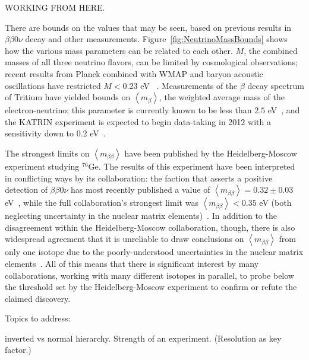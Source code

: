 WORKING FROM HERE.

There are bounds on the values that may be seen, based on previous results in $\beta\beta 0\nu$ decay and other measurements.  Figure~\ref{fig:NeutrinoMassBounds} shows how the various mass parameters can be related to each other.  $M$, the combined masses of all three neutrino flavors, can be limited by cosmological observations; recent results from Planck combined with WMAP and baryon acoustic oscillations have restricted $M < 0.23$ eV ~\cite{CosmologicalLimits}.  Measurements of the $\beta$ decay spectrum of Tritium have yielded bounds on $\left< m_\beta \right>$, the weighted average mass of the electron-neutrino; this parameter is currently known to be less than $2.5$ eV~\cite{OldTritium}, and the KATRIN experiment is expected to begin data-taking in 2012 with a sensitivity down to $0.2$ eV~\cite{NewTritium}.

The strongest limits on $\left< m_{\beta\beta} \right>$ have been published by the Heidelberg-Moscow experiment studying $^{76}$Ge.  The results of this experiment have been interpreted in conflicting ways by its collaboration:  the faction that asserts a positive detection of $\beta\beta 0\nu$ has most recently published a value of $\left< m_{\beta\beta} \right> = 0.32 \pm 0.03$ eV~\cite{Klapdor}, while the full collaboration's strongest limit was $\left< m_{\beta\beta} \right> < 0.35$ eV (both neglecting uncertainty in the nuclear matrix elements)~\cite{KlapdorDissent}.  In addition to the disagreement within the Heidelberg-Moscow collaboration, though, there is also widespread agreement that it is unreliable to draw conclusions on $\left< m_{\beta\beta} \right>$ from only one isotope due to the poorly-understood uncertainties in the nuclear matrix elements~\cite{RMPbb0n}.  All of this means that there is significant interest by many collaborations, working with many different isotopes in parallel, to probe below the threshold set by the Heidelberg-Moscow experiment to confirm or refute the claimed discovery.

Topics to address:

inverted vs normal hierarchy.
Strength of an experiment.  (Resolution as key factor.)
